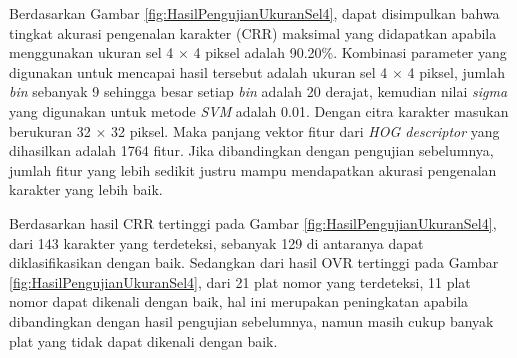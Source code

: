 \begin{adjustbox}{width=1\textwidth}
	\noindent\begin{minipage}{\linewidth}
		\centering{}
		\label{fig:HasilPengujianUkuranSel4}
	\end{minipage}
\end{adjustbox}

\noindent Berdasarkan Gambar \ref{fig:HasilPengujianUkuranSel4}, dapat disimpulkan bahwa tingkat akurasi pengenalan karakter (CRR) maksimal yang didapatkan apabila menggunakan ukuran sel 4 $\times$ 4 piksel adalah 90.20\%. Kombinasi parameter yang digunakan untuk mencapai hasil tersebut adalah ukuran sel 4 $\times$ 4 piksel, jumlah \textit{bin} sebanyak 9 sehingga besar setiap \textit{bin} adalah 20 derajat, kemudian nilai \textit{sigma} yang digunakan untuk metode \textit{SVM} adalah 0.01. Dengan citra karakter masukan berukuran 32 $\times$ 32 piksel. Maka panjang vektor fitur dari \textit{HOG descriptor} yang dihasilkan adalah 1764 fitur. Jika dibandingkan dengan pengujian sebelumnya, jumlah fitur yang lebih sedikit justru mampu mendapatkan akurasi pengenalan karakter yang lebih baik.

\noindent Berdasarkan hasil CRR tertinggi pada Gambar \ref{fig:HasilPengujianUkuranSel4}, dari 143 karakter yang terdeteksi, sebanyak 129 di antaranya dapat diklasifikasikan dengan baik. Sedangkan dari hasil OVR tertinggi pada Gambar \ref{fig:HasilPengujianUkuranSel4}, dari 21 plat nomor yang terdeteksi, 11 plat nomor dapat dikenali dengan baik, hal ini merupakan peningkatan apabila dibandingkan dengan hasil pengujian sebelumnya, namun masih cukup banyak plat yang tidak dapat dikenali dengan baik. 

